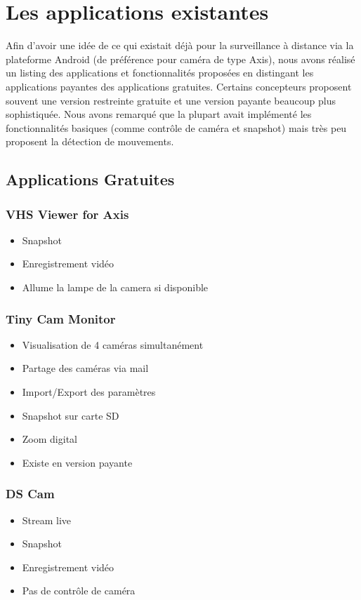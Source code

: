 \section{Les applications existantes}
Afin d'avoir une idée de ce qui existait déjà pour la surveillance à distance via la plateforme Android (de préférence pour caméra de type Axis), nous avons réalisé un listing des applications
et fonctionnalités proposées en distingant les applications payantes des
applications gratuites. Certains concepteurs proposent souvent une version
restreinte gratuite et une version payante beaucoup plus sophistiquée. Nous
avons remarqué que la plupart avait implémenté les fonctionnalités basiques (comme contrôle de caméra et snapshot) mais très peu proposent la détection de mouvements.

\subsection{Applications Gratuites}
\subsubsection{VHS Viewer for Axis}
\begin{itemize}
  \item Snapshot
  \item Enregistrement vidéo
  \item Allume la lampe de la camera si disponible
\end{itemize}

\subsubsection{Tiny Cam Monitor}
\begin{itemize}
  \item Visualisation de 4 caméras simultanément
  \item Partage des caméras via mail
  \item Import/Export des paramètres
  \item Snapshot sur carte SD
  \item Zoom digital
  \item Existe en version payante
\end{itemize}

\subsubsection{DS Cam}
\begin{itemize}
  \item Stream live
  \item Snapshot
  \item Enregistrement vidéo
  \item Pas de contrôle de caméra
\end{itemize}

